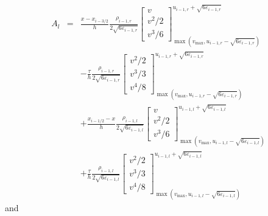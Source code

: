 \documentclass{fldauth}
\theoremstyle{plain}
\theoremstyle{plain}
\theoremstyle{plain}
\theoremstyle{plain}
\theoremstyle{plain}
\theoremstyle{plain}
\begin{document}
\begin{eqnarray*}
A_{l} & = & \frac{x-x_{i-3/2}}{h}\frac{\rho _{i-1,r}}{2\sqrt{6\varepsilon _{i-1,r}}}\left[ \begin{array}{c}
v\\
v^{2}/2\\
v^{3}/6
\end{array}\right] _{\max (v_{\max },u_{i-1,r}-\sqrt{6\varepsilon _{i-1,r}})}^{u_{i-1,r}+\sqrt{6\varepsilon _{i-1,r}}}\\
 &  & -\frac{\tau }{h}\frac{\rho _{i-1,r}}{2\sqrt{6\varepsilon _{i-1,r}}}\left[ \begin{array}{c}
v^{2}/2\\
v^{3}/3\\
v^{4}/8
\end{array}\right] _{\max (v_{\max },u_{i-1,r}-\sqrt{6\varepsilon _{i-1,r}})}^{u_{i-1,r}+\sqrt{6\varepsilon _{i-1,r}}}\\
 &  & +\frac{x_{i-1/2}-x}{h}\frac{\rho _{i-1,l}}{2\sqrt{6\varepsilon _{i-1,l}}}\left[ \begin{array}{c}
v\\
v^{2}/2\\
v^{3}/6
\end{array}\right] _{\max (v_{\max },u_{i-1,l}-\sqrt{6\varepsilon _{i-1,l}})}^{u_{i-1,l}+\sqrt{6\varepsilon _{i-1,l}}}\\
 &  & +\frac{\tau }{h}\frac{\rho _{i-1,l}}{2\sqrt{6\varepsilon _{i-1,l}}}\left[ \begin{array}{c}
v^{2}/2\\
v^{3}/3\\
v^{4}/8
\end{array}\right] _{\max (v_{\max },u_{i-1,l}-\sqrt{6\varepsilon _{i-1,l}})}^{u_{i-1,l}+\sqrt{6\varepsilon _{i-1,l}}}
\end{eqnarray*}
 and
\end{document}
